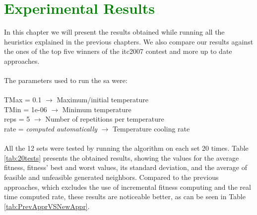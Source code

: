 \chapter{\textcolor{green}{Experimental Results}}
\label{chap:ExpResults}

In this chapter we will present the results obtained while running all the heuristics explained in the previous chapters. We also compare our results against the ones of the top five winners of the \gls{itc2007} contest and more up to date approaches.\\
\\
The parameters used to run the \gls{sa} were:\\
\\
TMax = 0.1 $\rightarrow$ Maximum/initial temperature\\
TMin = 1e-06 $\rightarrow$ Minimum temperature\\
reps = 5 $\rightarrow$ Number of repetitions per temperature\\
rate = \textit{computed automatically} $\rightarrow$ Temperature cooling rate\\
\\
All the 12 sets were tested by running the algorithm on each set 20 times. Table \ref{tab:20tests} presents the obtained results, showing the values for the average fitness, fitness' best and worst values, its standard deviation, and the average of feasible and unfeasible generated neighbors. Compared to the previous approaches, which excludes the use of incremental fitness computing and the real time computed rate, these results are noticeable better, as can be seen in Table \ref{tab:PrevApprVSNewAppr}. \\
\\
